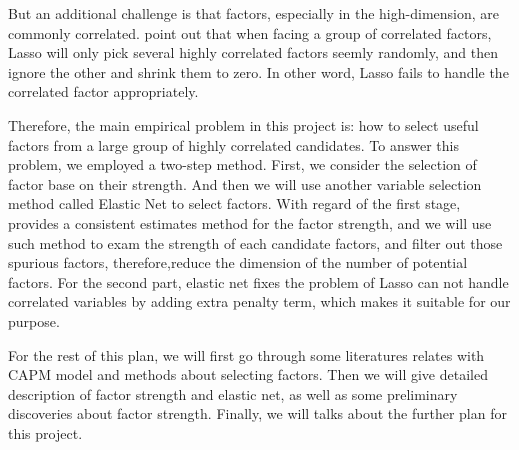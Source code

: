 \documentclass[12pt]{article}
\begin{document}
But an additional challenge is that factors, especially in the high-dimension, are commonly correlated.
 point out that when facing a group of correlated factors, Lasso will only pick several highly correlated factors seemly randomly, and then ignore the other and shrink them to zero. 
In other word, Lasso fails to handle the correlated factor appropriately.









Therefore, the main empirical problem in this project is: how to select useful factors from a large group of  highly correlated candidates.
To answer this problem, we employed a two-step method. 
First, we consider the selection of factor base on their strength.
And then we will use another variable selection method called Elastic Net \cite{Zou2005} to select factors.
With regard of the first stage,  provides a consistent estimates method for the factor strength, and we will use such method to exam the strength of each candidate factors, and filter out those spurious factors, therefore,reduce the dimension of the number of potential factors.
For the second part, elastic net fixes the problem of Lasso can not handle correlated variables by adding extra penalty term, which makes it suitable for our purpose. 

For the rest of this plan, we will first go through some literatures relates with CAPM model and methods about selecting factors. 
Then we will give detailed description of factor strength and elastic net, as well as some preliminary  discoveries about factor strength.
Finally, we will talks about the further plan for this project.
\end{document}
